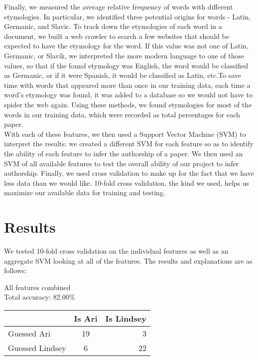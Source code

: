 \documentclass[twocolumn]{article}
\begin{document}
  Finally, we measured the average relative frequency of words with different etymologies. In particular, we identified three potential origins for words - Latin, Germanic, and Slavic. To track down the etymologies of each word in a document, we built a web crawler to search a few websites that should be expected to have the etymology for the word. If this value was not one of Latin, Germanic, or Slavik, we interpreted the more modern language to one of those values, so that if the found etymology was English, the word would be classified as Germanic, or if it were Spanish, it would be classified as Latin, etc.To save time with words that appeared more than once in our training data, each time a word's etymology was found, it was added to a database so we would not have to spider the web again. Using these methods, we found etymologies for most of the words in our training data, which were recorded as total percentages for each paper. \\
  
  With each of these features, we then used a Support Vector Machine (SVM) to interpret the results: we created a different SVM for each feature so as to identify the ability of each feature to infer the authorship of a paper. We then used an SVM of all available features to test the overall ability of our project to infer authorship. Finally, we used cross validation to make up for the fact that we have less data than we would like. 10-fold cross validation, the kind we used, helps us maximize our available data for training and testing.
  
  \section{Results}
  We tested 10-fold cross validation on the individual features as well as an aggregate SVM looking at all of the features. The results and explanations are as follows:
  
  \begin{center}
    All features combined \\
    Total accuracy: 82.00\%
    \begin{tabular}{ l || c | r }
      \hline
      & Is Ari & Is Lindsey \\ \hline
      Guessed Ari & 19 & 3 \\ \hline
      Guessed Lindsey & 6 & 22 \\
      \hline
    \end{tabular}
  \end{center}
  
\end{document}
